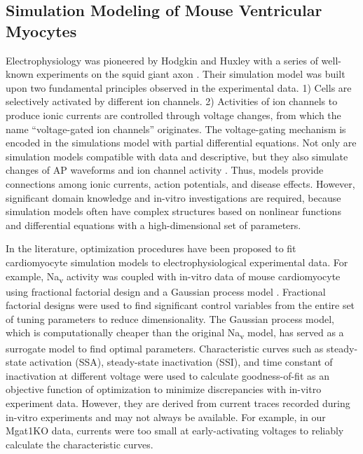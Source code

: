 \documentclass[10pt,letterpaper]{article}
\begin{document}
\subsection*{Simulation Modeling of Mouse Ventricular Myocytes}
Electrophysiology was pioneered by Hodgkin and Huxley with a series of well-known experiments on the squid giant axon \cite{hodgkin1952quantitative}. Their simulation model was built upon two fundamental principles observed in the experimental data. 1) Cells are selectively activated by different ion channels. 2) Activities of ion channels to produce ionic currents are controlled through voltage changes, from which the name ``voltage-gated ion channels'' originates. The voltage-gating mechanism is encoded in the simulations model with partial differential equations. Not only are simulation models compatible with data and descriptive, but they also simulate changes of AP waveforms and ion channel activity \cite{mullins2013mathematical}. Thus, models provide connections among ionic currents, action potentials, and disease effects. However, significant domain knowledge and in-vitro investigations are required, because simulation models often have complex structures based on nonlinear functions and differential equations with a high-dimensional set of parameters.

In the literature, optimization procedures have been proposed to fit cardiomyocyte simulation models to electrophysiological experimental data. For example, Na\textsubscript{v} activity was coupled with in-vitro data of mouse cardiomyocyte using fractional factorial design and a Gaussian process model \cite{du2015statistical}. Fractional factorial designs were used to find significant control variables from the entire set of tuning parameters to reduce dimensionality. The Gaussian process model, which is computationally cheaper than the original Na\textsubscript{v} model, has served as a surrogate model to find optimal parameters. Characteristic curves such as steady-state activation (SSA), steady-state inactivation (SSI), and time constant of inactivation at different voltage were used to calculate goodness-of-fit as an objective function of optimization to minimize discrepancies with in-vitro experiment data. However, they are derived from current traces recorded during in-vitro experiments and may not always be available. For example, in our Mgat1KO data, currents were too small at early-activating voltages to reliably calculate the characteristic curves.  
\end{document}
